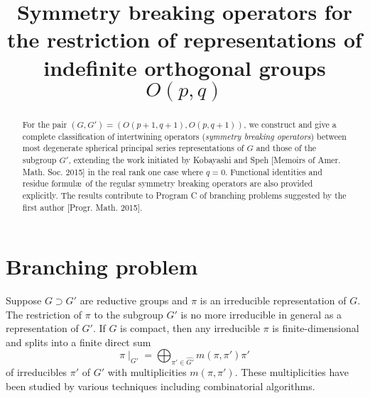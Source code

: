 \documentclass[reqno,12pt]{pja00} %
\theoremstyle{plain}
\theoremstyle{definition}
\theoremstyle{exampstyle} \newtheorem{examp}[theorem]{Theorem}
\begin{document}
\title{Symmetry breaking operators for the restriction of representations of indefinite orthogonal groups $O(p,q)$}

  \maketitle
\begin{abstract}
	For the pair $(G, G') =(O(p+1, q+1), O(p,q+1))$, we construct and give a complete classification of intertwining operators (\textit{symmetry breaking operators})
	between
most degenerate spherical
principal series representations of 
$G$ and those of the subgroup $G'$, extending the work initiated by
 Kobayashi and Speh  [Memoirs of Amer. Math. Soc. 2015]
in the real rank one case where $q=0$.
Functional identities and residue formul\ae\, of the regular symmetry breaking operators are also provided 
explicitly.
The results contribute to Program C of branching problems suggested by the first author [Progr. Math. 2015].
\end{abstract}

\section{Branching problem}

Suppose $G \supset G'$ are reductive groups and $\pi$ is an irreducible
representation of $G$. 
The restriction of $\pi$ to the subgroup $G'$ is no more irreducible in general as a representation
of $G'$. If $G$ is compact, then any irreducible $\pi$ is finite-dimensional and splits
into a finite direct sum
\[ \pi\!\mid_{G'} = \bigoplus_{\pi' \in \widehat{G'}} m (\pi, \pi') \pi' \]
of irreducibles $\pi'$ of $G'$ with multiplicities $m(\pi,\pi')$. These multiplicities have been studied
by various techniques including combinatorial algorithms.
\end{document}

